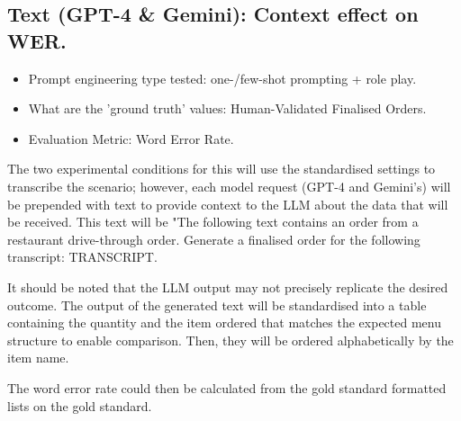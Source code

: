 
\subsection{Text (GPT-4 \& Gemini): Context effect on WER.}

\begin{itemize}
    \item Prompt engineering type tested: one-/few-shot prompting + role play.
    \item What are the 'ground truth' values: Human-Validated Finalised Orders.
    \item Evaluation Metric: Word Error Rate.
\end{itemize}

The two experimental conditions for this will use the standardised settings to transcribe the scenario; however, each model request (GPT-4 and Gemini's) will be prepended with text to provide context to the LLM about the data that will be received. This text will be "The following text contains an order from a restaurant drive-through order. Generate a finalised order for the following transcript: TRANSCRIPT.  

It should be noted that the LLM output may not precisely replicate the desired outcome. The output of the generated text will be standardised into a table containing the quantity and the item ordered that matches the expected menu structure to enable comparison. Then, they will be ordered alphabetically by the item name. 

The word error rate could then be calculated from the gold standard formatted lists on the gold standard. 
